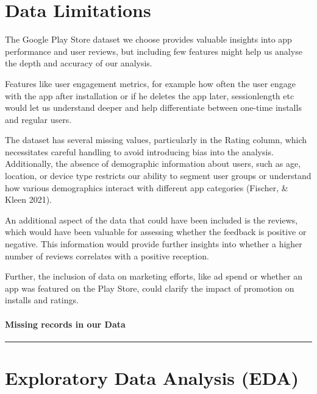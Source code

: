 \documentclass[
]{article}
\begin{document}
\section{\texorpdfstring{\textbf{Data
Limitations}}{Data Limitations}}\label{data-limitations}

The Google Play Store dataset we choose provides valuable insights into
app performance and user reviews, but including few features might help
us analyse the depth and accuracy of our analysis.

Features like user engagement metrics, for example how often the user
engage with the app after installation or if he deletes the app later,
sessionlength etc would let us understand deeper and help differentiate
between one-time installs and regular users.

The dataset has several missing values, particularly in the Rating
column, which necessitates careful handling to avoid introducing bias
into the analysis. Additionally, the absence of demographic information
about users, such as age, location, or device type restricts our ability
to segment user groups or understand how various demographics interact
with different app categories (Fischer, \& Kleen 2021).

An additional aspect of the data that could have been included is the
reviews, which would have been valuable for assessing whether the
feedback is positive or negative. This information would provide further
insights into whether a higher number of reviews correlates with a
positive reception.

Further, the inclusion of data on marketing efforts, like ad spend or
whether an app was featured on the Play Store, could clarify the impact
of promotion on installs and ratings.

\paragraph{Missing records in our
Data}\label{missing-records-in-our-data}

\begin{center}\rule{0.5\linewidth}{0.5pt}\end{center}

\section{\texorpdfstring{\textbf{Exploratory Data Analysis
(EDA)}}{Exploratory Data Analysis (EDA)}}\label{exploratory-data-analysis-eda}
\end{document}
